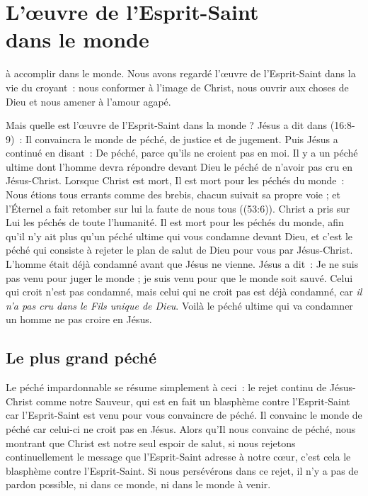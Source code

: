 \chapter[L'\oe{}uvre de l'Esprit-Saint dans le monde]{L'\oe{}uvre de l'Esprit-Saint\\ dans le monde}

 à accomplir dans le monde.
 Nous avons regardé l'œuvre de l'Esprit-Saint dans la vie du croyant~:
 nous conformer à l'image de Christ, nous ouvrir aux choses de Dieu
 et nous amener à l'amour agapé.

Mais quelle est l'œuvre de l'Esprit-Saint dans la monde ?
 Jésus a dit dans (16:8-9)~:
 \og Il convaincra le monde de péché, de justice et de jugement. \fg{}
 Puis Jésus a continué en disant~:
 \og De péché, parce qu'ils ne croient pas en moi. \fg{}
 Il y a un péché ultime dont l'homme devra répondre devant Dieu
 \ocadr le péché de n'avoir pas cru en Jésus-Christ.
 Lorsque Christ est mort, Il est mort pour les péchés du monde~:
 \og Nous étions tous errants comme des brebis,
 chacun suivait sa propre voie ;
 et l'Éternel a fait retomber sur lui la faute de nous tous \fg{}
 ((53:6)).
 Christ a pris sur Lui les péchés de toute l'humanité.
 Il est mort pour les péchés du monde, afin qu'il n'y ait plus qu'un péché
 ultime qui vous condamne devant Dieu, et c'est le péché qui consiste
 à rejeter le plan de salut de Dieu pour vous par Jésus-Christ.
 L'homme était déjà condamné avant que Jésus ne vienne.
 Jésus a dit~: \og Je ne suis pas venu pour juger le monde ;
 je suis venu pour que le monde soit sauvé.
 Celui qui croit n'est pas condamné, mais celui qui ne croit pas
 est déjà condamné, car \emph{il n'a pas cru dans le Fils
 unique de Dieu}. \fg{}
 Voilà le péché ultime qui va condamner un homme
 \ocadr ne pas croire en Jésus.


\section*{Le plus grand péché}


Le péché impardonnable se résume simplement à ceci~:
 le rejet continu de Jésus-Christ comme notre Sauveur,
 qui est en fait un blasphème contre l'Esprit-Saint
 car l'Esprit-Saint est venu pour vous convaincre de péché.
 Il \og convainc le monde de péché \fg{} car celui-ci
 ne croit pas en Jésus.
 Alors qu'Il nous convainc de péché, nous montrant que Christ
 est notre seul espoir de salut, si nous rejetons continuellement
 le message que l'Esprit-Saint adresse à notre cœur,
 c'est cela le blasphème contre l'Esprit-Saint.
 Si nous persévérons dans ce rejet, il n'y a pas de pardon possible,
 ni dans ce monde, ni dans le monde à venir.

